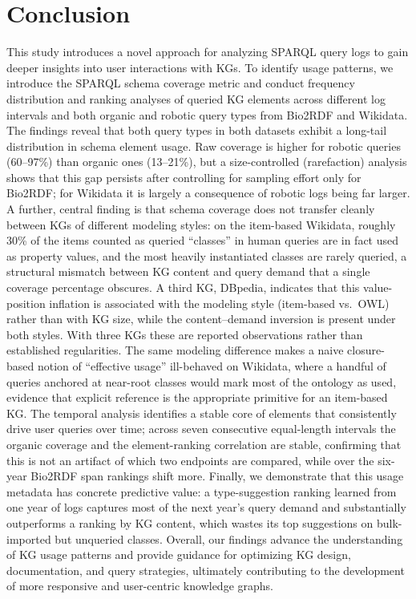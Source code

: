 \documentclass[sw]{iosart2x}
\begin{document}
\section{Conclusion}\label{s6}
This study introduces a novel approach for analyzing SPARQL query logs to gain deeper insights into user interactions with KGs. To identify usage patterns, we introduce the SPARQL schema coverage metric and conduct frequency distribution and ranking analyses of queried KG elements across different log intervals and both organic and robotic query types from Bio2RDF and Wikidata.
The findings reveal that both query types in both datasets exhibit a long-tail distribution in schema element usage. Raw coverage is higher for robotic queries (60--97\%) than organic ones (13--21\%), but a size-controlled (rarefaction) analysis shows that this gap persists after controlling for sampling effort only for Bio2RDF; for Wikidata it is largely a consequence of robotic logs being far larger. A further, central finding is that schema coverage does not transfer cleanly between KGs of different modeling styles: on the item-based Wikidata, roughly 30\% of the items counted as queried ``classes'' in human queries are in fact used as property values, and the most heavily instantiated classes are rarely queried, a structural mismatch between KG content and query demand that a single coverage percentage obscures. A third KG, DBpedia, indicates that this value-position inflation is associated with the modeling style (item-based vs.\ OWL) rather than with KG size, while the content--demand inversion is present under both styles. With three KGs these are reported observations rather than established regularities. The same modeling difference makes a naive closure-based notion of ``effective usage'' ill-behaved on Wikidata, where a handful of queries anchored at near-root classes would mark most of the ontology as used, evidence that explicit reference is the appropriate primitive for an item-based KG.
The temporal analysis identifies a stable core of elements that consistently drive user queries over time; across seven consecutive equal-length intervals the organic coverage and the element-ranking correlation are stable, confirming that this is not an artifact of which two endpoints are compared, while over the six-year Bio2RDF span rankings shift more. Finally, we demonstrate that this usage metadata has concrete predictive value: a type-suggestion ranking learned from one year of logs captures most of the next year's query demand and substantially outperforms a ranking by KG content, which wastes its top suggestions on bulk-imported but unqueried classes.
Overall, our findings advance the understanding of KG usage patterns and provide guidance for optimizing KG design, documentation, and query strategies, ultimately contributing to the development of more responsive and user-centric knowledge graphs.
\end{document}
